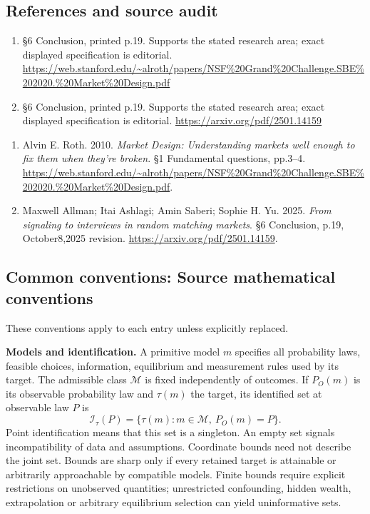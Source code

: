 \documentclass[11pt,a4paper]{article}
\begin{document}
\subsection*{References and source audit}
\begin{enumerate}
\item §6 Conclusion, printed p.19. Supports the stated research area; exact displayed specification is editorial. \url{https://web.stanford.edu/~alroth/papers/NSF%20Grand%20Challenge.SBE%202020.%20Market%20Design.pdf}
\item §6 Conclusion, printed p.19. Supports the stated research area; exact displayed specification is editorial. \url{https://arxiv.org/pdf/2501.14159}
\end{enumerate}
\begin{enumerate}\raggedright
\item\hypertarget{definitions:source:30007579:1}{} Alvin E. Roth. 2010. \emph{Market Design: Understanding markets well enough to fix them when they’re broken}. §1 Fundamental questions, pp.3–4.
\url{https://web.stanford.edu/~alroth/papers/NSF%20Grand%20Challenge.SBE%202020.%20Market%20Design.pdf}.
\item\hypertarget{definitions:source:30007579:2}{} Maxwell Allman; Itai Ashlagi; Amin Saberi; Sophie H. Yu. 2025. \emph{From signaling to interviews in random matching markets}. §6 Conclusion, p.19, October8,2025 revision.
\url{https://arxiv.org/pdf/2501.14159}.
\end{enumerate}

\subsection*{Common conventions: Source mathematical conventions}

These conventions apply to each entry unless explicitly replaced.

\textbf{Models and identification.} A primitive model \(m\) specifies all probability laws, feasible choices, information, equilibrium and measurement rules used by its target. The admissible class \(\mathcal M\) is fixed independently of outcomes. If \(P_O(m)\) is its observable probability law and \(\tau(m)\) the target, its identified set at observable law \(P\) is
\[
 \mathcal I_\tau(P)=\{\tau(m):m\in\mathcal M,\ P_O(m)=P\}.
\]
Point identification means that this set is a singleton. An empty set signals incompatibility of data and assumptions. Coordinate bounds need not describe the joint set. Bounds are sharp only if every retained target is attainable or arbitrarily approachable by compatible models. Finite bounds require explicit restrictions on unobserved quantities; unrestricted confounding, hidden wealth, extrapolation or arbitrary equilibrium selection can yield uninformative sets.
\end{document}
